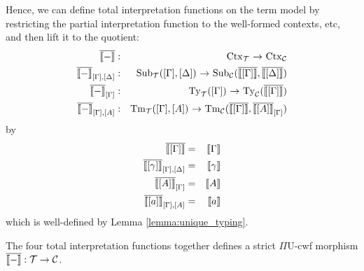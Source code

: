 \documentclass{lmcs}
\def\UU{\mathrm{U}}
\begin{document}

%

Hence, we can define total interpretation functions on the term model by restricting the partial 
interpretation function to the well-formed contexts, etc, and then lift it to the quotient:
\begin{eqnarray*}
\iniCtx{-} &:& \Ctx_\T\ \arrow\ \Ctx_\C\\
\iniSub{[\Gamma]}{[\Delta]}{-} &:&
 \Sub_\T([\Gamma],{[\Delta]}) \ \arrow \
 \Sub_\C(\iniCtx{[\Gamma]},{\iniCtx{[\Delta]}})\\
\iniTy{[\Gamma]}{-} &:& \Ty_\T([\Gamma])\ \arrow\ \Ty_\C(\iniCtx{[\Gamma]})\\
\iniTm{[\Gamma]}{[A]}{-} &:& \Tm_\T([\Gamma],[A])\ \arrow\ \Tm_\C(\iniCtx{[\Gamma]},\iniTy{[\Gamma]}{[A]})
\end{eqnarray*}
by
\begin{eqnarray*}
\iniCtx{[\Gamma]} &=& \inte{\Gamma}\\
\iniSub{[\Gamma]}{[\Delta]}{[\gamma]} &=& \inte{\gamma}\\
\iniTy{[\Gamma]}{[A]} &=& \inte{A}\\
\iniTm{[\Gamma]}{[A]}{[a]} &=& \inte{a}
\end{eqnarray*}
which is well-defined by Lemma \ref{lemma:unique_typing}.

The four total interpretation functions together defines a strict $\Pi\UU$-cwf
morphism $\iniCtx{-} :\T  \rightarrow  \C$.
\end{document}
